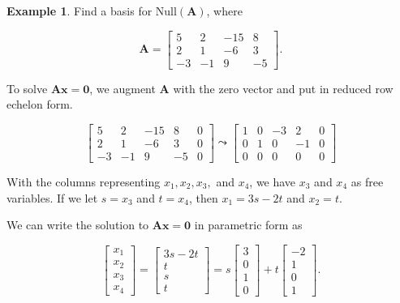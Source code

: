 \documentclass[
]{book}
\theoremstyle{definition}
\theoremstyle{definition}
\newtheorem{example}{Example}[chapter]
\theoremstyle{definition}
\theoremstyle{definition}
\theoremstyle{remark}
\begin{document}
\begin{examplebox}

\begin{example}
Find a basis for \(\text{Null}(\mathbf{A})\), where

\[\mathbf{A}=\begin{bmatrix}5 & 2 & -15 & 8\\2 & 1 & -6 & 3\\-3 & -1 & 9 & -5\end{bmatrix}.\]

To solve \(\mathbf{A}\mathbf{x}=\mathbf{0}\), we augment \(\mathbf{A}\) with the zero vector and put in reduced row echelon form.

\[\left[\begin{array}{rrrr|r}5 & 2 & -15 & 8 & 0\\2 & 1 & -6 & 3& 0\\-3 & -1 & 9 & -5& 0\end{array}\right]\leadsto \left[\begin{array}{rrrr|r} 1 & 0 & -3 & 2 & 0\\0 & 1 & 0 & -1 & 0\\0 & 0 & 0 & 0 & 0\end{array}\right]\]

With the columns representing \(x_1,x_2,x_3,\) and \(x_4\), we have \(x_3\) and \(x_4\) as free variables. If we let \(s=x_3\) and \(t=x_4\), then \(x_1=3s-2t\) and \(x_2=t\).

We can write the solution to \(\mathbf{A}\mathbf{x}=\mathbf{0}\) in parametric form as

\[\begin{bmatrix}x_1\\x_2\\x_3\\x_4\end{bmatrix}=\begin{bmatrix}3s-2t\\t\\s\\t\end{bmatrix}=s\begin{bmatrix}3\\0\\1\\0\end{bmatrix}+t\begin{bmatrix}-2\\1\\0\\1\end{bmatrix}.\]


\end{example}
\end{examplebox}
\end{document}
